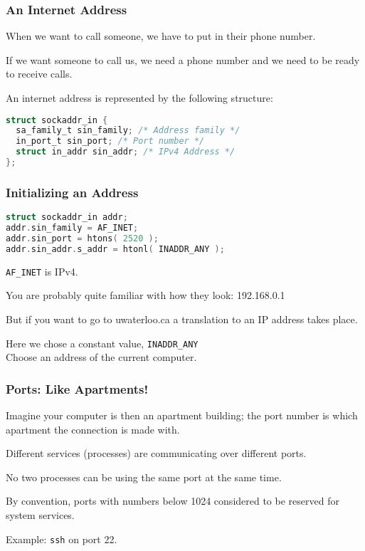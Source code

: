 \begin{frame}[fragile]
	\frametitle{An Internet Address}

	When we want to call someone, we have to put in their phone number.

	If we want someone to call us, we need a phone number and we need to be ready to receive calls.

	An internet address is represented by the following structure:
	\begin{lstlisting}[language=C]
struct sockaddr_in {
  sa_family_t sin_family; /* Address family */
  in_port_t sin_port; /* Port number */
  struct in_addr sin_addr; /* IPv4 Address */
};
\end{lstlisting}

\end{frame}


\begin{frame}[fragile]
	\frametitle{Initializing an Address}

	\begin{lstlisting}[language=C]
struct sockaddr_in addr;
addr.sin_family = AF_INET;
addr.sin_port = htons( 2520 );
addr.sin_addr.s_addr = htonl( INADDR_ANY );
\end{lstlisting}

	\texttt{AF\_INET} is IPv4.

	You are probably quite familiar with how they look: 192.168.0.1

	But if you want to go to uwaterloo.ca a translation to an IP address takes place.

	Here we chose a constant value, \texttt{INADDR\_ANY}\\
	\quad Choose an address of the current computer.

\end{frame}


\begin{frame}
	\frametitle{Ports: Like Apartments!}

	Imagine your computer is then an apartment building; the port number is which apartment the connection is made with.

	Different services (processes) are communicating over different ports.

	No two processes can be using the same port at the same time.

	By convention, ports with numbers below 1024 considered to be reserved for system services.

	Example: \texttt{ssh} on port 22.

\end{frame}


